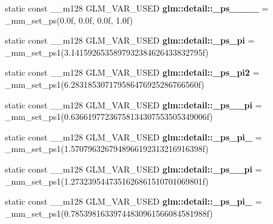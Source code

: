 \begin{DoxyCompactItemize}
\item 
\hypertarget{namespaceglm_1_1detail_a8959836c3b33ac3b522c6cde06cd212d}{}static const \+\_\+\+\_\+m128 G\+L\+M\+\_\+\+V\+A\+R\+\_\+\+U\+S\+E\+D {\bfseries glm\+::detail\+::\+\_\+ps\+\_\+\_\+\_\+\_} = \+\_\+mm\+\_\+set\+\_\+ps(0.\+0f, 0.\+0f, 0.\+0f, 1.\+0f)\label{namespaceglm_1_1detail_a8959836c3b33ac3b522c6cde06cd212d}

\item 
\hypertarget{namespaceglm_1_1detail_aee03017500fda7fb578db2e0c341c29b}{}static const \+\_\+\+\_\+m128 G\+L\+M\+\_\+\+V\+A\+R\+\_\+\+U\+S\+E\+D {\bfseries glm\+::detail\+::\+\_\+ps\+\_\+pi} = \+\_\+mm\+\_\+set\+\_\+ps1(3.\+1415926535897932384626433832795f)\label{namespaceglm_1_1detail_aee03017500fda7fb578db2e0c341c29b}

\item 
\hypertarget{namespaceglm_1_1detail_aba416c81a0ed4ef979588306d9711dd7}{}static const \+\_\+\+\_\+m128 G\+L\+M\+\_\+\+V\+A\+R\+\_\+\+U\+S\+E\+D {\bfseries glm\+::detail\+::\+\_\+ps\+\_\+pi2} = \+\_\+mm\+\_\+set\+\_\+ps1(6.\+283185307179586476925286766560f)\label{namespaceglm_1_1detail_aba416c81a0ed4ef979588306d9711dd7}

\item 
\hypertarget{namespaceglm_1_1detail_a11c577cbd20b5b5dd5e2c9a16bcf830c}{}static const \+\_\+\+\_\+m128 G\+L\+M\+\_\+\+V\+A\+R\+\_\+\+U\+S\+E\+D {\bfseries glm\+::detail\+::\+\_\+ps\+\_\+\_\+pi} = \+\_\+mm\+\_\+set\+\_\+ps1(0.\+63661977236758134307553505349006f)\label{namespaceglm_1_1detail_a11c577cbd20b5b5dd5e2c9a16bcf830c}

\item 
\hypertarget{namespaceglm_1_1detail_a5e30d3993d62044169fdfadc3bf9ff24}{}static const \+\_\+\+\_\+m128 G\+L\+M\+\_\+\+V\+A\+R\+\_\+\+U\+S\+E\+D {\bfseries glm\+::detail\+::\+\_\+ps\+\_\+pi\+\_} = \+\_\+mm\+\_\+set\+\_\+ps1(1.\+5707963267948966192313216916398f)\label{namespaceglm_1_1detail_a5e30d3993d62044169fdfadc3bf9ff24}

\item 
\hypertarget{namespaceglm_1_1detail_a47d4b70ef7fdbb1a63ceca13beab7476}{}static const \+\_\+\+\_\+m128 G\+L\+M\+\_\+\+V\+A\+R\+\_\+\+U\+S\+E\+D {\bfseries glm\+::detail\+::\+\_\+ps\+\_\+\_\+pi} = \+\_\+mm\+\_\+set\+\_\+ps1(1.\+2732395447351626861510701069801f)\label{namespaceglm_1_1detail_a47d4b70ef7fdbb1a63ceca13beab7476}

\item 
\hypertarget{namespaceglm_1_1detail_a0f5627c5dbf79a6168512f7cbf9a8709}{}static const \+\_\+\+\_\+m128 G\+L\+M\+\_\+\+V\+A\+R\+\_\+\+U\+S\+E\+D {\bfseries glm\+::detail\+::\+\_\+ps\+\_\+pi\+\_} = \+\_\+mm\+\_\+set\+\_\+ps1(0.\+78539816339744830961566084581988f)\label{namespaceglm_1_1detail_a0f5627c5dbf79a6168512f7cbf9a8709}


\end{DoxyCompactItemize}
